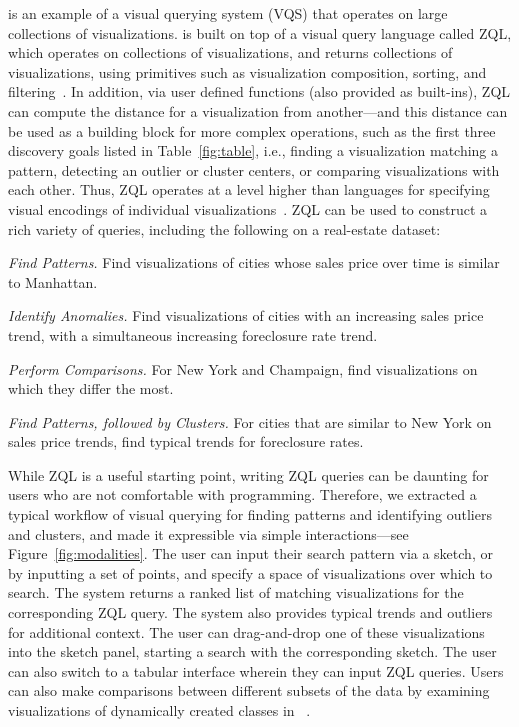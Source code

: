 \par \zv is an example of a visual querying system (VQS) that operates on 
large collections of visualizations.
\zv is built on top of a visual query language
called ZQL, which operates on collections of visualizations, and returns
collections of visualizations,
using primitives such as visualization composition,
sorting, and filtering~\cite{Siddiqui2016}. 
In addition, via user defined functions (also provided as built-ins),
ZQL can compute the distance for a visualization from another---and this
distance can be used as a building block for more complex
operations, such as the first three discovery goals listed
in Table~\ref{fig:table}, i.e., finding a visualization
matching a pattern, detecting an outlier or cluster centers,
or comparing visualizations with each other.
Thus, ZQL operates at a level higher than
languages for specifying visual encodings of
individual visualizations~\cite{Stolte2002,Wilkinson2005}.
ZQL can be used to construct a rich variety of queries,
including the following on a real-estate dataset:
\squishlist
	\item {\em Find Patterns.} Find visualizations of cities whose sales price over time is similar to Manhattan. 
	\item {\em Identify Anomalies.} Find visualizations of cities with an increasing sales price trend, with a simultaneous increasing foreclosure rate trend.
	\item {\em Perform Comparisons.} For New York and Champaign, find visualizations on which they differ the most.
	\item {\em Find Patterns, followed by Clusters.} For cities that are similar
	to New York on sales price trends, find typical trends for foreclosure rates.
\squishend

\par While ZQL is a useful starting point, writing ZQL
queries can be daunting for users who are not comfortable
with programming.
Therefore, we extracted a typical workflow
of visual querying for finding patterns and identifying
outliers and clusters, and made it expressible
via simple interactions---see Figure~\ref{fig:modalities}.
The user can input their search pattern via a sketch,
or by inputting a set of points,
and specify a space of visualizations over which to search.
The system returns a ranked list of matching visualizations
for the corresponding ZQL query.
The system also provides typical trends and outliers
for additional context. 
The user can drag-and-drop one of these visualizations
into the sketch panel, starting a search with the corresponding
sketch.
The user can also switch to a tabular interface wherein
they can input ZQL queries.  
Users can also make comparisons between different 
subsets of the data by examining visualizations 
of dynamically created classes in \zv~\cite{Lee2017}.

